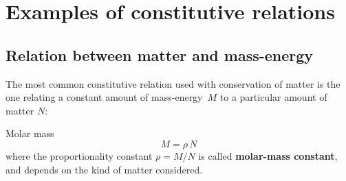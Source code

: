 \documentclass[a4paper,12pt,%
onecolumn,oneside,titlepage,%
british%
]{memoir}
\newcommand*{\defd}{\coloneqq}
\renewcommand*{\|}[1][]{\nonscript\:#1\vert\nonscript\:\mathopen{}}
\newcommand*{\yN}{N}
\newcommand*{\yJ}{J}
\newcommand*{\yrho}{\rho}
\newcommand*{\yM}{M}%
\newcommand*{\masse}{mass-energy}
\begin{document}

\section{Examples of constitutive relations}
\label{sec:matter_constitutive}

\subsection{Relation between matter and \masse}
\label{sec:const_matter_mass}

The most common constitutive relation used  with conservation of matter is the one relating a constant amount of \masse\ $\yM$ to a particular amount of matter $\yN$:
\begin{definition}{Molar mass}
  \begin{equation}
    \label{eq:molar_mass}
    \yM = \yrho\, \yN
  \end{equation}
  where the proportionality constant $\yrho=\yM/\yN$ is called \textbf{molar-mass constant}, and depends on the kind of matter considered.
\end{definition}
\end{document}

